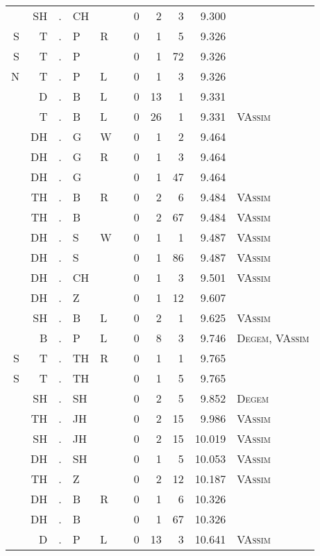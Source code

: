\begin{longtable}{r@{ } r@{ } c@{ } l@{ } l@{ } l@{ } r r r r l }
  & SH & . & CH &   &   & 0 & 2 & 3 & 9.300 &  \\
S & T & . & P & R &   & 0 & 1 & 5 & 9.326 &  \\
S & T & . & P &   &   & 0 & 1 & 72 & 9.326 &  \\
N & T & . & P & L &   & 0 & 1 & 3 & 9.326 &  \\
  & D & . & B & L &   & 0 & 13 & 1 & 9.331 &  \\
  & T & . & B & L &   & 0 & 26 & 1 & 9.331 & \textsc{VAssim} \\
  & DH & . & G & W &   & 0 & 1 & 2 & 9.464 &  \\
  & DH & . & G & R &   & 0 & 1 & 3 & 9.464 &  \\
  & DH & . & G &   &   & 0 & 1 & 47 & 9.464 &  \\
  & TH & . & B & R &   & 0 & 2 & 6 & 9.484 & \textsc{VAssim} \\
  & TH & . & B &   &   & 0 & 2 & 67 & 9.484 & \textsc{VAssim} \\
  & DH & . & S & W &   & 0 & 1 & 1 & 9.487 & \textsc{VAssim} \\
  & DH & . & S &   &   & 0 & 1 & 86 & 9.487 & \textsc{VAssim} \\
  & DH & . & CH &   &   & 0 & 1 & 3 & 9.501 & \textsc{VAssim} \\
  & DH & . & Z &   &   & 0 & 1 & 12 & 9.607 &  \\
  & SH & . & B & L &   & 0 & 2 & 1 & 9.625 & \textsc{VAssim} \\
  & B & . & P & L &   & 0 & 8 & 3 & 9.746 & \textsc{Degem}, \textsc{VAssim} \\
S & T & . & TH & R &   & 0 & 1 & 1 & 9.765 &  \\
S & T & . & TH &   &   & 0 & 1 & 5 & 9.765 &  \\
  & SH & . & SH &   &   & 0 & 2 & 5 & 9.852 & \textsc{Degem} \\
  & TH & . & JH &   &   & 0 & 2 & 15 & 9.986 & \textsc{VAssim} \\
  & SH & . & JH &   &   & 0 & 2 & 15 & 10.019 & \textsc{VAssim} \\
  & DH & . & SH &   &   & 0 & 1 & 5 & 10.053 & \textsc{VAssim} \\
  & TH & . & Z &   &   & 0 & 2 & 12 & 10.187 & \textsc{VAssim} \\
  & DH & . & B & R &   & 0 & 1 & 6 & 10.326 &  \\
  & DH & . & B &   &   & 0 & 1 & 67 & 10.326 &  \\
  & D & . & P & L &   & 0 & 13 & 3 & 10.641 & \textsc{VAssim} \\

\end{longtable}
